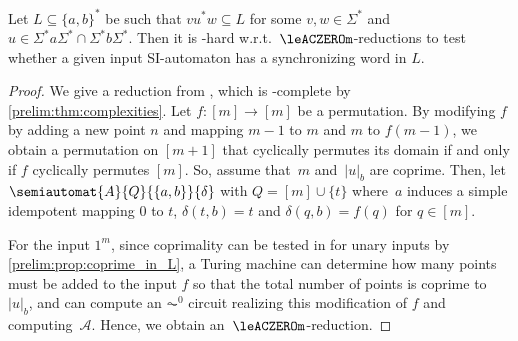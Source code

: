 \begin{proposition} \label{constrsync:prop:SI-binary-sync-in-L-hard}
	Let $L \subseteq \{a,b\}^*$ 
	be such that $v u^* w \subseteq L$ for some $v,w \in \Sigma^*$
	and $u \in \Sigma^*a\Sigma^* \cap \Sigma^*b\Sigma^*$.
	Then it is \LOGSPACE-hard w.r.t.~$\leACZEROm$-reductions
	to test whether a given input SI-automaton
	has a synchronizing word in $L$.	
\end{proposition}
\begin{proof}
	We give a reduction from \SCP, which is \LOGSPACE-complete
	by \cref{prelim:thm:complexities}.
    Let $f \colon [m] \to [m]$
	be a permutation. 
	By modifying $f$ by  
	adding a new point $n$
	and mapping $m-1$ to $m$
	and $m$ to $f(m-1)$,
	we obtain a permutation on $[m+1]$
	that cyclically permutes its domain
	if and only if $f$ cyclically permutes $[m]$.
    So, assume that~$m$ and~$|u|_b$
	are coprime.
	Then, let $\semiautomat{A}{Q}{\{a,b\}}{\delta}$
	with $Q = [m] \cup \{t\}$ where~$a$ induces a simple idempotent mapping $0$ to $t$, $\delta(t, b) = t$
	and $\delta(q, b) = f(q)$ for $q \in [m]$.
		
	For the input $1^m$, since coprimality can be tested in \LOGSPACE 
	for unary inputs by \cref{prelim:prop:coprime_in_L}, a Turing machine can determine how many points must be added 
	to the input $f$ so that the total number of points is coprime to $|u|_b$, 
	and can compute an $\AC^0$ circuit realizing this modification of $f$ 
	and computing~$\mathcal{A}$. Hence, we obtain an~$\leACZEROm$-reduction.	
		
%
%


\end{proof}
